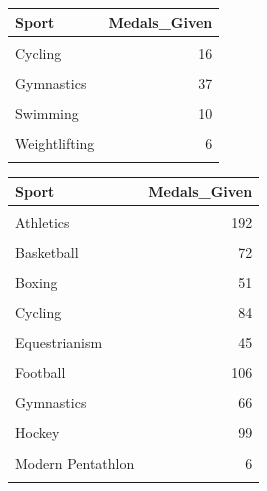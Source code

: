 \documentclass[
]{article}
\begin{document}
\begin{table}
\centering
\begin{tabular}[t]{lr}
\toprule
Sport & \vphantom{1} Medals\_Given\\
\midrule
\cellcolor{gray!10}{Athletics} & \cellcolor{gray!10}{37}\\
Cycling & 16\\
\cellcolor{gray!10}{Fencing} & \cellcolor{gray!10}{9}\\
Gymnastics & 37\\
\cellcolor{gray!10}{Shooting} & \cellcolor{gray!10}{15}\\
\addlinespace
Swimming & 10\\
\cellcolor{gray!10}{Tennis} & \cellcolor{gray!10}{10}\\
Weightlifting & 6\\
\cellcolor{gray!10}{Wrestling} & \cellcolor{gray!10}{3}\\
\bottomrule
\end{tabular}
\centering
\begin{tabular}[t]{lr}
\toprule
Sport & Medals\_Given\\
\midrule
\cellcolor{gray!10}{Archery} & \cellcolor{gray!10}{24}\\
Athletics & 192\\
\cellcolor{gray!10}{Badminton} & \cellcolor{gray!10}{24}\\
Basketball & 72\\
\cellcolor{gray!10}{Beach Volleyball} & \cellcolor{gray!10}{12}\\
\addlinespace
Boxing & 51\\
\cellcolor{gray!10}{Canoeing} & \cellcolor{gray!10}{82}\\
Cycling & 84\\
\cellcolor{gray!10}{Diving} & \cellcolor{gray!10}{36}\\
Equestrianism & 45\\
\addlinespace
\cellcolor{gray!10}{Fencing} & \cellcolor{gray!10}{65}\\
Football & 106\\
\cellcolor{gray!10}{Golf} & \cellcolor{gray!10}{6}\\
Gymnastics & 66\\
\cellcolor{gray!10}{Handball} & \cellcolor{gray!10}{89}\\
\addlinespace
Hockey & 99\\
\cellcolor{gray!10}{Judo} & \cellcolor{gray!10}{56}\\
Modern Pentathlon & 6\\
\cellcolor{gray!10}{Rhythmic Gymnastics} & \cellcolor{gray!10}{18}\\

\end{tabular}
\end{table}
\end{document}
